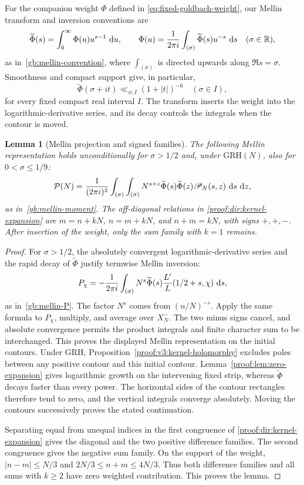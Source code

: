\documentclass[12pt,a4paper]{amsart}
\numberwithin{equation}{section}
\def\d{\,{\rm d}}
\def\le{\leqslant}
\def\ge{\geqslant}
\theoremstyle{plain}
\newtheorem{lemma}[proposition]{Lemma}
\theoremstyle{definition}
\theoremstyle{remark}
\begin{document}
For the companion weight $\Phi$ defined in \eqref{eq:fixed-goldbach-weight},
our Mellin transform and inversion conventions are
\[
 \widetilde\Phi(s)=\int_0^\infty\Phi(u)u^{s-1}\,\d u,
 \qquad
 \Phi(u)=\frac1{2\pi i}\int_{(\sigma)}
              \widetilde\Phi(s)u^{-s}\,\d s
 \quad(\sigma\in\mathbb R),
\]
as in~\eqref{gb:mellin-convention},
where $\int_{(\sigma)}$ is directed upwards along $\Re s=\sigma$.
Smoothness and compact support give, in particular,
\[
 \widetilde\Phi(\sigma+it)\ll_{\phi,I}(1+|t|)^{-6}
 \quad(\sigma\in I),
\]
for every fixed compact real interval $I$. The transform inserts
the weight into the logarithmic-derivative series, and its decay
controls the integrals when the contour is moved.

\begin{lemma}[Mellin projection and signed families]
\label{proof:v9:mellin-signed-families}
The following Mellin representation holds unconditionally for
$\sigma>1/2$ and, under $\mathrm{GRH}(N)$, also for
$0<\sigma\le1/9$:
\[
 \mathcal P(N)=\frac1{(2\pi i)^2}
 \int_{(\sigma)}\int_{(\sigma)}
 N^{s+z}\widetilde\Phi(s)\widetilde\Phi(z)\mathscr P_N(s,z)
 \,\d s\,\d z,
\]
as in~\eqref{gb:mellin-moment}.
The off-diagonal relations in \eqref{proof:dir:kernel-expansion} are
$m=n+kN$, $n=m+kN$, and $n+m=kN$, with signs $+,+,-$.
After insertion of the weight, only the sum family with $k=1$ remains.
\end{lemma}

\begin{proof}
For $\sigma>1/2$, the absolutely convergent logarithmic-derivative
series and the rapid decay of $\widetilde\Phi$ justify termwise
Mellin inversion:
\[
 P_\chi=-\frac1{2\pi i}\int_{(\sigma)}
       N^s\widetilde\Phi(s)\frac{L'}L(1/2+s,\chi)\,\d s,
\]
as in~\eqref{gb:mellin-P}.
The factor $N^s$ comes from $(n/N)^{-s}$. Apply the same formula
to $P_{\bar\chi}$, multiply, and average over $X_N^-$.
The two minus signs cancel, and absolute convergence permits the
product integrals and finite character sum to be interchanged.
This proves the displayed Mellin representation on the initial contours.
Under GRH, Proposition~\ref{proof:v3:kernel-holomorphy} excludes
poles between any positive contour and this initial contour.
Lemma~\ref{proof:lem:zero-expansion} gives logarithmic growth on
the intervening fixed strip, whereas $\widetilde\Phi$ decays faster
than every power. The horizontal sides of the contour rectangles
therefore tend to zero, and the vertical integrals converge absolutely.
Moving the contours successively proves the stated continuation.

Separating equal from unequal indices in the first congruence of
\eqref{proof:dir:kernel-expansion} gives the diagonal and the two
positive difference families. The second congruence gives the negative
sum family. On the support of the weight, $|n-m|\le N/3$ and
$2N/3\le n+m\le4N/3$. Thus both difference families and all sums
with $k\ge2$ have zero weighted contribution.
This proves the lemma.
\end{proof}
\end{document}
